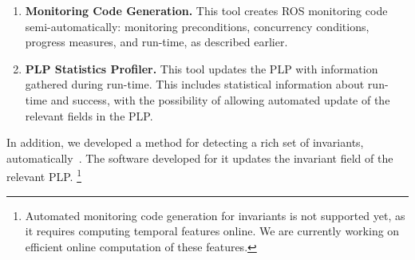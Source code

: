 \documentclass[letterpaper]{article}
\begin{document}
{\begin{enumerate}
\item {\bf Monitoring Code Generation.} This tool creates
ROS monitoring code semi-automatically: monitoring preconditions, concurrency conditions, progress measures, and run-time, as described earlier.

\item {\bf PLP Statistics Profiler.}
This tool updates the PLP with information gathered during run-time.
This includes statistical information about run-time and success, with the possibility of allowing automated update of the relevant fields in the PLP.
\end{enumerate}
In addition, we  developed a method for detecting a rich set of invariants, automatically~\citep{MatanThesis}. The software developed for it updates the invariant field of the relevant PLP.%
\footnote{Automated monitoring code generation for invariants is not supported yet, as it requires computing temporal features online. We are currently working on efficient online computation of these features.}
} %




\end{document}
